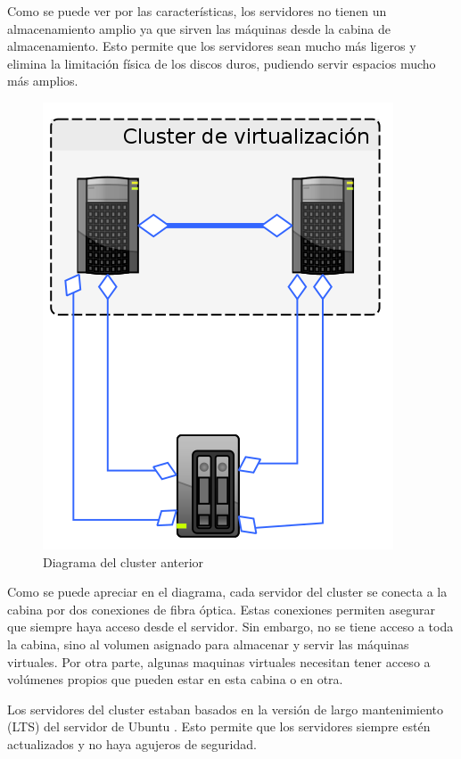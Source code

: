 \documentclass[12pt,a4paper,titlepage,twoside]{report}
\begin{document}
\par Como se puede ver por las características, los servidores no tienen un almacenamiento amplio ya que sirven las máquinas desde la cabina de almacenamiento. Esto permite que los servidores sean mucho más ligeros y elimina la limitación física de los discos duros, pudiendo servir espacios mucho más amplios.
\begin{figure}[h]
\caption{Diagrama del cluster anterior}
\centering
\includegraphics[scale=0.5]{cluster-anterior}
\end{figure}
\par
Como se puede apreciar en el diagrama, cada servidor del cluster se conecta a la cabina por dos conexiones de fibra óptica. Estas conexiones permiten asegurar que siempre haya acceso desde el servidor. Sin embargo, no se tiene acceso a toda la cabina, sino al volumen asignado para almacenar y servir las máquinas virtuales. Por otra parte, algunas maquinas virtuales necesitan tener acceso a volúmenes propios que pueden estar en esta cabina o en otra. 
\par
Los servidores del cluster estaban basados en la versión de largo mantenimiento (LTS) del servidor de Ubuntu \cite{ubuntu}. Esto permite que los servidores siempre estén actualizados y no haya agujeros de seguridad.
\end{document}
